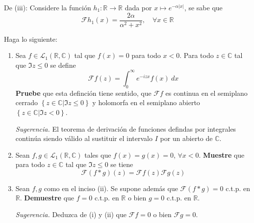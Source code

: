 \documentclass[12pt]{report}
\theoremstyle{largebreak}
\renewcommand{\leq}{\ensuremath{\leqslant}}
\newcommand\abs[1]{\ensuremath{\left|#1\right|}}
\newcommand\cf[3]{\ensuremath{#1:#2\rightarrow#3}}
\newcommand{\fou}[1]{\ensuremath{\mathcal{F}#1}}
\begin{document}
\begin{sol}
        De (iii): Considere la función $\cf{h_1}{\mathbb{R}}{\mathbb{R}}$ dada por $x\mapsto e^{-\alpha\abs{x}}$, se sabe que
        \begin{equation*}
            \fou{h_1}(x)=\frac{2\alpha}{\alpha^2+x^2},\quad\forall x\in\mathbb{R}
        \end{equation*}
    \end{sol}

    \begin{excer}
        Haga lo siguiente:
        \begin{enumerate}
            \item Sea $f\in\mathcal{L}_1(\mathbb{R},\mathbb{C})$ tal que $f(x)=0$ para todo $x<0$. Para todo $z\in\mathbb{C}$ tal que $\Im z\leq 0$ se define
            \begin{equation*}
                \fou{f}(z)=\int_0^{\infty}e^{ -izx}f(x)\:dx
            \end{equation*}
            \textbf{Pruebe} que esta definción tiene sentido, que $\fou{f}$ es continua en el semiplano cerrado $\left\{z\in\mathbb{C}\Big|\Im z\leq0 \right\}$ y holomorfa en el semiplano abierto $\left\{z\in\mathbb{C}\Big|\Im z<0 \right\}$.

            \textit{Sugerencia.} El teorema de derivación de funciones defindas por integrales continúa siendo válido al sustituir el intervalo $I$ por un abierto de $\mathbb{C}$.

            \item Sean $f,g\in\mathcal{L}_1(\mathbb{R},\mathbb{C})$ tales que $f(x)=g(x)=0$, $\forall x<0$. \textbf{Muestre} que para todo $z\in\mathbb{C}$ tal que $\Im z\leq 0$ se tiene
            \begin{equation*}
                \fou{(f*g)}(z)=\fou{f}(z)\fou{g}(z)
            \end{equation*}
            \item Sean $f,g$ como en el inciso (ii). Se supone además que $\fou{(f*g)}=0$ c.t.p. en $\mathbb{R}$. \textbf{Demuestre} que $f=0$ c.t.p. en $\mathbb{R}$ o bien $g=0$ c.t.p. en $\mathbb{R}$.
            
            \textit{Sugerencia.} Deduzca de (i) y (ii) que $\fou{f}=0$ o bien $\fou{g}=0$.
        \end{enumerate}
    \end{excer}
\end{document}
